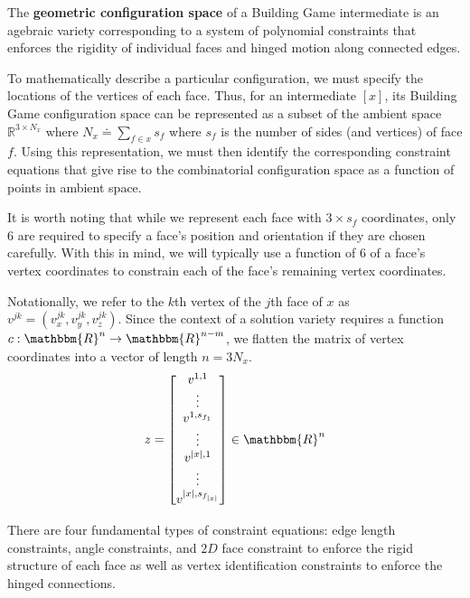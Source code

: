 \begin{mydef}
The \textbf{geometric configuration space} of a Building Game intermediate is an agebraic variety corresponding to a system of polynomial constraints that enforces the rigidity of individual faces and hinged motion along connected edges.
\end{mydef}

To mathematically describe a particular configuration, we must specify the locations of the vertices of each face. Thus, for an intermediate $[x]$, its Building Game configuration space can be represented as a subset of the ambient space $\mathbb{R}^{3\times N_x}$ where $N_x \doteq \sum_{f\in x} s_f$ where $s_f$ is the number of sides (and vertices) of face $f$. Using this representation, we must then identify the corresponding constraint equations that give rise to the combinatorial configuration space as a function of points in ambient space. 

It is worth noting that while we represent each face with $3\times s_f$ coordinates, only 6 are required to specify a face's position and orientation if they are chosen carefully. With this in mind, we will typically use a function of $6$ of a face's vertex coordinates to constrain each of the face's remaining vertex coordinates. 


Notationally, we refer to the $k$th vertex of the $j$th face of $x$ as $v^{jk} = \left(v^{jk}_x,v^{jk}_y,v^{jk}_z\right)$. Since the context of a solution variety requires a function $c: \mathbbm{R}^n \to \mathbbm{R}^{n-m}$, we flatten the matrix of vertex coordinates into a vector of length $n = 3N_x$. 
\begin{align}
z = \begin{bmatrix} v^{1,1} \\ \vdots \\ v^{1,s_{f_1}} \\ \vdots \\ v^{|x|,1} \\ \vdots \\ v^{|x|,s_{f_{|x|}}} \end{bmatrix} \in \mathbbm{R}^n
\end{align}

There are four fundamental types of constraint equations: edge length constraints, angle constraints, and $2D$ face constraint to enforce the rigid structure of each face as well as vertex identification constraints to enforce the hinged connections.

